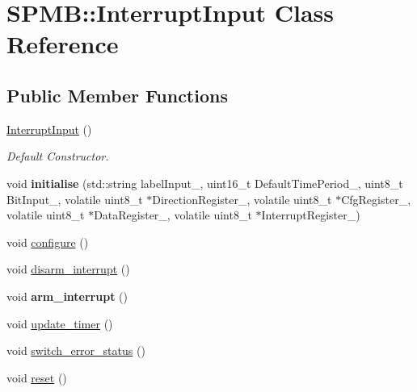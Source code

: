 \hypertarget{classSPMB_1_1InterruptInput}{}\section{S\+P\+MB\+:\+:Interrupt\+Input Class Reference}
\label{classSPMB_1_1InterruptInput}
\subsection*{Public Member Functions}
\begin{DoxyCompactItemize}
\item 
\hyperlink{classSPMB_1_1InterruptInput_a1d7054c59edcd2989088eda0d6615370}{Interrupt\+Input} ()\hypertarget{classSPMB_1_1InterruptInput_a1d7054c59edcd2989088eda0d6615370}{}\label{classSPMB_1_1InterruptInput_a1d7054c59edcd2989088eda0d6615370}

\begin{DoxyCompactList}\small\item\em Default Constructor. \end{DoxyCompactList}\item 
void {\bfseries initialise} (std\+::string label\+Input\+\_\+, uint16\+\_\+t Default\+Time\+Period\+\_\+, uint8\+\_\+t Bit\+Input\+\_\+, volatile uint8\+\_\+t $\ast$Direction\+Register\+\_\+, volatile uint8\+\_\+t $\ast$Cfg\+Register\+\_\+, volatile uint8\+\_\+t $\ast$Data\+Register\+\_\+, volatile uint8\+\_\+t $\ast$Interrupt\+Register\+\_\+)\hypertarget{classSPMB_1_1InterruptInput_a537b9601886237322cd01b4d66a1cae3}{}\label{classSPMB_1_1InterruptInput_a537b9601886237322cd01b4d66a1cae3}

\item 
void \hyperlink{classSPMB_1_1InterruptInput_af458652456481ec1ee7af3381f4df732}{configure} ()
\item 
void \hyperlink{classSPMB_1_1InterruptInput_a434a4a22e379f9d3e70340ca638ef0d9}{disarm\+\_\+interrupt} ()
\item 
void {\bfseries arm\+\_\+interrupt} ()\hypertarget{classSPMB_1_1InterruptInput_a6f677f7648a3252791ab61df4c5e64b6}{}\label{classSPMB_1_1InterruptInput_a6f677f7648a3252791ab61df4c5e64b6}

\item 
void \hyperlink{classSPMB_1_1InterruptInput_af827e44330f1054bdfdb28861dbd6505}{update\+\_\+timer} ()
\item 
void \hyperlink{classSPMB_1_1InterruptInput_a454efe88ea6a9c5047e5c34b9d1f7e4b}{switch\+\_\+error\+\_\+status} ()
\item 
void \hyperlink{classSPMB_1_1InterruptInput_adb38e98b59d2c4487bedd00eba453ab2}{reset} ()
\end{DoxyCompactItemize}
